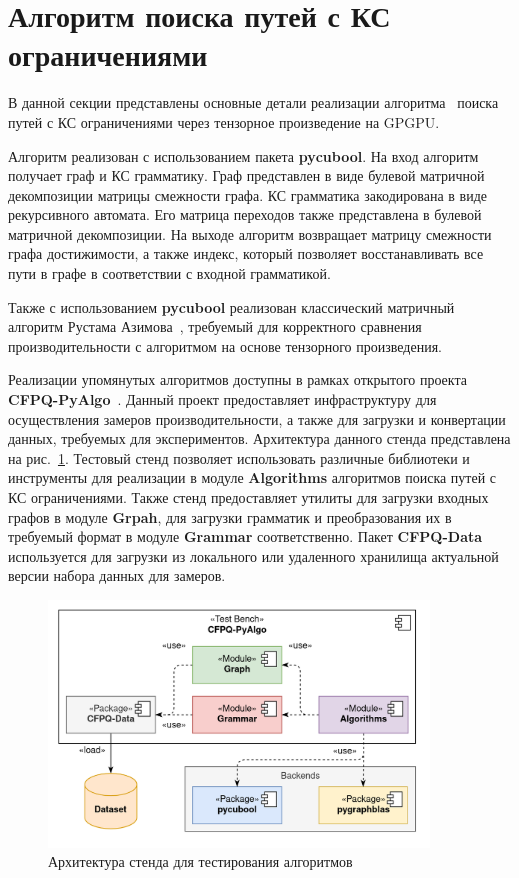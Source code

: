 \section{Алгоритм поиска путей с КС ограничениями}
\label{section:algo_impl}

В данной секции представлены основные детали реализации алгоритма~\cite{inbook:kronecker_cfpq_adbis} поиска путей с КС ограничениями через тензорное произведение на GPGPU.

Алгоритм реализован с использованием пакета \textbf{pycubool}. 
На вход алгоритм получает граф и КС грамматику. 
Граф представлен в виде булевой матричной декомпозиции матрицы смежности графа.
КС грамматика закодирована в виде рекурсивного автомата. 
Его матрица переходов также представлена в булевой матричной декомпозиции.
На выходе алгоритм возвращает матрицу смежности графа достижимости, а также индекс, 
который позволяет восстанавливать все пути в графе в соответствии с входной грамматикой.

Также с использованием \textbf{pycubool} реализован классический матричный алгоритм Рустама Азимова~\cite{inproceedings:matrix_cfpq}, требуемый для корректного сравнения производительности с алгоритмом на основе тензорного произведения.

Реализации упомянутых алгоритмов доступны в рамках открытого проекта \textbf{CFPQ-PyAlgo}~\cite{net:cfpq_py_algo}.
Данный проект предоставляет инфраструктуру для осуществления замеров производительности, а также для загрузки и конвертации данных, требуемых для экспериментов.
Архитектура данного стенда представлена на рис.~\ref{fig:cfpq_py_algo}. 
Тестовый стенд позволяет использовать различные библиотеки и инструменты для реализации в модуле  \textbf{Algorithms} алгоритмов поиска путей с КС ограничениями. Также стенд предоставляет утилиты для загрузки входных графов в модуле \textbf{Grpah}, для загрузки грамматик и преобразования их в требуемый формат в модуле \textbf{Grammar} соответственно.
Пакет \textbf{CFPQ-Data}~\cite{net:cfpq_data} используется для загрузки из локального или удаленного хранилища актуальной версии набора данных для замеров.

\begin{figure}[]
    \centering
    \includegraphics[width=0.9\textwidth]{images/cfpq_pyalgo.png}
    \caption{Архитектура стенда для тестирования алгоритмов}
    \label{fig:cfpq_py_algo}
\end{figure}

